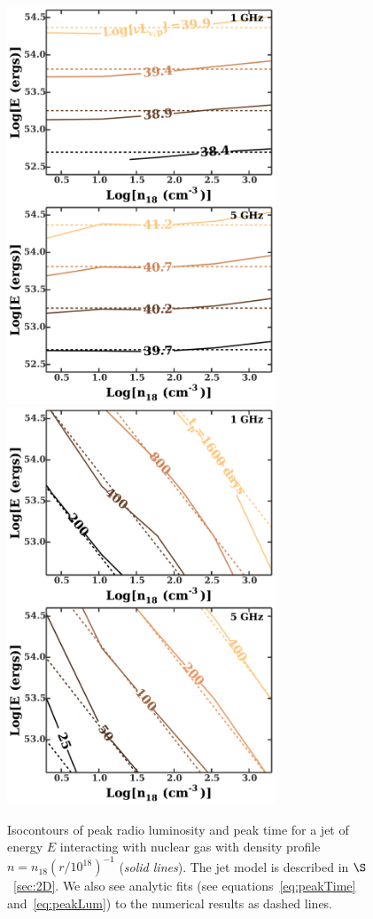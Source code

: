 \documentclass[usenatbib,fleqn]{mnras}
\begin{document}
\begin{figure}
  \includegraphics[width=8cm]{lp_contours.pdf}
  \includegraphics[width=8cm]{tp_contours.pdf}
  \caption{\label{fig:jetContours} Isocontours of peak radio
    luminosity and peak time for a jet of energy $E$ interacting with
    nuclear gas with density profile $n=n_{18}
    \left(r/10^{18}\right)^{-1}$ (\textit{solid lines}). The jet model is described in 
  $\S$~\ref{sec:2D}. We also see analytic fits (see
  equations~\eqref{eq:peakTime} and~\eqref{eq:peakLum}) to the
  numerical results as dashed lines.}
\end{figure}
\end{document}
